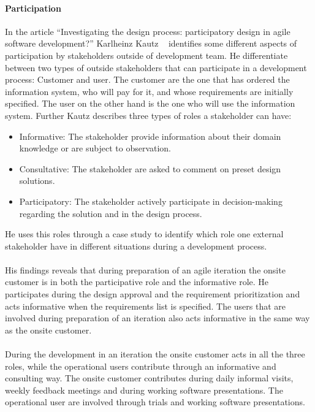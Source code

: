 \documentclass{article}
\begin{document}
\paragraph{Participation}
In the article ``Investigating the design process: participatory design in agile software development?'' Karlheinz Kautz ~\cite{Kautz} identifies some different aspects of participation by stakeholders outside of development team. He differentiate between two types of outside stakeholders that can participate in a development process: Customer and user. The customer are the one that has ordered the information system, who will pay for it, and whose requirements are initially specified. The user on the other hand is the one who will use the information system. Further Kautz describes three types of roles a stakeholder can have: 

\begin{itemize}
	\item Informative: The stakeholder provide information about their domain knowledge or are subject to observation.
	\item Consultative: The stakeholder are asked to comment on preset design solutions.
	\item Participatory: The stakeholder actively participate in decision-making regarding the solution and in the design process.
\end{itemize}

He uses this roles through a case study to identify which role one external stakeholder have in different situations during a development process. 

\paragraph{} His findings reveals that during preparation of an agile iteration the onsite customer is in both the participative role and the informative role. He participates during the design approval and the requirement prioritization and acts informative when the requirements list is specified. The users that are involved during preparation of an iteration also acts informative in the same way as the onsite customer.

\paragraph{} During the development in an iteration the onsite customer acts in all the three roles, while the operational users contribute through an informative and consulting way. The onsite customer contributes during daily informal visits, weekly feedback meetings and during working software presentations. The operational user are involved through trials and working software presentations. 
\end{document}
